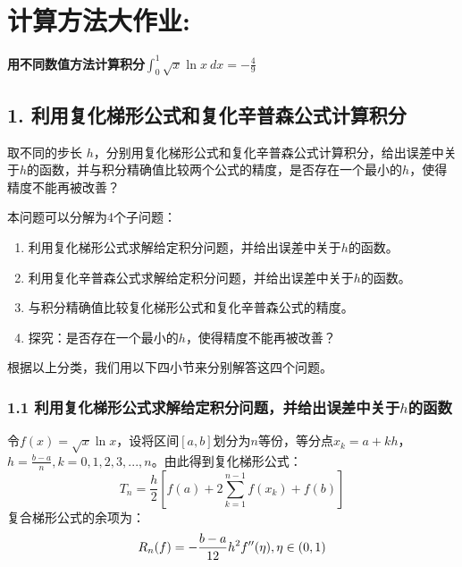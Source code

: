
\chapter{计算方法大作业:}
\begin{center}
    \textbf{用不同数值方法计算积分$\int_{0}^{1} \sqrt{x} \ln x  \ dx = -\frac{4}{9}$}
\end{center}

\section*{1. 利用复化梯形公式和复化辛普森公式计算积分}

取不同的步长 $h$，分别用复化梯形公式和复化辛普森公式计算积分，给出误差中关于$h$的函数，并与积分精确值比较两个公式的精度，是否存在一个最小的$h$，使得精度不能再被改善？

本问题可以分解为4个子问题：
\begin{enumerate}
    \item 利用复化梯形公式求解给定积分问题，并给出误差中关于$h$的函数。
    \item 利用复化辛普森公式求解给定积分问题，并给出误差中关于$h$的函数。
    \item 与积分精确值比较复化梯形公式和复化辛普森公式的精度。
    \item 探究：是否存在一个最小的$h$，使得精度不能再被改善？
\end{enumerate}

根据以上分类，我们用以下四小节来分别解答这四个问题。

\subsection*{1.1 利用复化梯形公式求解给定积分问题，并给出误差中关于$h$的函数}

令$f(x) = \sqrt{x} \ln x$，设将区间$[a,b]$划分为$n$等份，等分点$x_k = a + kh$，$h = \frac{b-a}{n},k=0,1,2,3,...,n$。由此得到复化梯形公式：
\begin{equation}
    T_n = \frac{h}{2} [f(a) + 2\sum_{k=1}^{n-1} f(x_k) + f(b) ]
    \label{eq:compound_trapezoid_general}
\end{equation}
复合梯形公式的余项为：
\begin{equation}
    R_n(f) = -\frac{b-a}{12} h^2 f^{\prime\prime} (\eta), \\ \eta\in(0,1)
    \label{eq:compound_trapezoid_R_general}
\end{equation}

